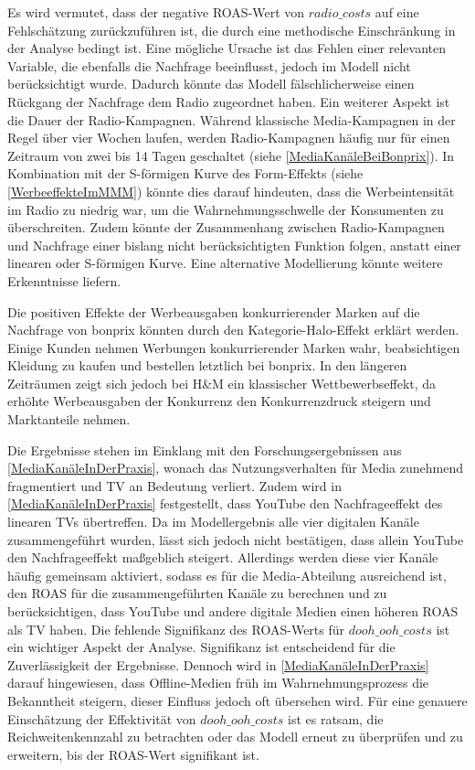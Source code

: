 Es wird vermutet, dass der negative \ac{ROAS}-Wert von \(radio\_costs\) auf eine Fehlschätzung zurückzuführen ist, die durch eine methodische Einschränkung in der Analyse bedingt ist. Eine mögliche Ursache ist das Fehlen einer relevanten Variable, die ebenfalls die Nachfrage beeinflusst, jedoch im Modell nicht berücksichtigt wurde. Dadurch könnte das Modell fälschlicherweise einen Rückgang der Nachfrage dem Radio zugeordnet haben. Ein weiterer Aspekt ist die Dauer der Radio-Kampagnen. Während klassische Media-Kampagnen in der Regel über vier Wochen laufen, werden Radio-Kampagnen häufig nur für einen Zeitraum von zwei bis 14 Tagen geschaltet (siehe \autoref{MediaKanäleBeiBonprix}). In Kombination mit der S-förmigen Kurve des Form-Effekts (siehe \autoref{WerbeeffekteImMMM}) könnte dies darauf hindeuten, dass die Werbeintensität im Radio zu niedrig war, um die Wahrnehmungsschwelle der Konsumenten zu überschreiten. Zudem könnte der Zusammenhang zwischen Radio-Kampagnen und Nachfrage einer bislang nicht berücksichtigten Funktion folgen, anstatt einer linearen oder S-förmigen Kurve. Eine alternative Modellierung könnte weitere Erkenntnisse liefern. \par
Die positiven Effekte der Werbeausgaben konkurrierender Marken auf die Nachfrage von bonprix könnten durch den Kategorie-Halo-Effekt erklärt werden. Einige Kunden nehmen Werbungen konkurrierender Marken wahr, beabsichtigen Kleidung zu kaufen und bestellen letztlich bei bonprix. In den längeren Zeiträumen zeigt sich jedoch bei H\&M ein klassischer Wettbewerbseffekt, da erhöhte Werbeausgaben der Konkurrenz den Konkurrenzdruck steigern und Marktanteile nehmen.  \par 
Die Ergebnisse stehen im Einklang mit den Forschungsergebnissen aus \autoref{MediaKanäleInDerPraxis}, wonach das Nutzungsverhalten für Media zunehmend fragmentiert und TV an Bedeutung verliert. Zudem wird in \autoref{MediaKanäleInDerPraxis} festgestellt, dass YouTube den Nachfrageeffekt des linearen TVs übertreffen. Da im Modellergebnis alle vier digitalen Kanäle zusammengeführt wurden, lässt sich jedoch nicht bestätigen, dass allein YouTube den Nachfrageeffekt maßgeblich steigert. Allerdings werden diese vier Kanäle häufig gemeinsam aktiviert, sodass es für die Media-Abteilung ausreichend ist, den \ac{ROAS} für die zusammengeführten Kanäle zu berechnen und zu berücksichtigen, dass YouTube und andere digitale Medien einen höheren \ac{ROAS} als TV haben. Die fehlende Signifikanz des \ac{ROAS}-Werts für \(dooh\_ooh\_costs\) ist ein wichtiger Aspekt der Analyse. Signifikanz ist entscheidend für die Zuverlässigkeit der Ergebnisse. Dennoch wird in \autoref{MediaKanäleInDerPraxis} darauf hingewiesen, dass Offline-Medien früh im Wahrnehmungsprozess die Bekanntheit steigern, dieser Einfluss jedoch oft übersehen wird. Für eine genauere Einschätzung der Effektivität von \(dooh\_ooh\_costs\) ist es ratsam, die Reichweitenkennzahl zu betrachten oder das Modell erneut zu überprüfen und zu erweitern, bis der \ac{ROAS}-Wert signifikant ist. 
